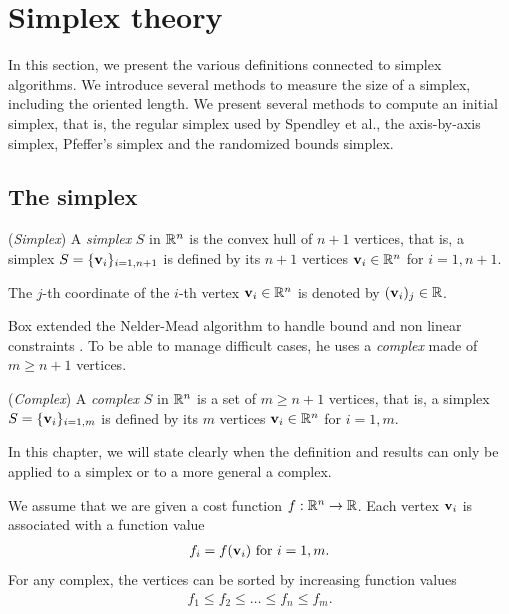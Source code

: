 \chapter{Simplex theory}

In this section, we present the various definitions connected
to simplex algorithms. We introduce several methods to measure 
the size of a simplex, including the oriented length. 
We present several methods to compute an
initial simplex, that is, the regular simplex used by Spendley et al.,
the axis-by-axis simplex, Pfeffer's simplex and the randomized 
bounds simplex.

\section{The simplex}

\begin{definition}
(\emph{Simplex})
A \emph{simplex} $S$ in $\mathbb{R}^n$ is the convex hull of $n+1$ vertices, that is, 
a simplex $S=\{\mathbf{v}_i\}_{i=1,n+1}$ is defined 
by its $n+1$ vertices $\mathbf{v}_i \in \mathbb{R}^n$ for $i=1,n+1$.
\end{definition}

The $j$-th coordinate of the $i$-th vertex $\mathbf{v}_i\in\mathbb{R}^n$ is denoted  
by $(\mathbf{v}_i)_j\in\mathbb{R}$.

Box extended the Nelder-Mead algorithm to handle bound and non linear constraints \cite{Box1965}.
To be able to manage difficult cases, he uses a \emph{complex} made of $m\geq n+1$ vertices.

\begin{definition}
(\emph{Complex})
A \emph{complex} $S$ in $\mathbb{R}^n$ is a set of $m\geq n+1$ vertices, that is, 
a simplex $S=\{\mathbf{v}_i\}_{i=1,m}$ is defined 
by its $m$ vertices $\mathbf{v}_i \in \mathbb{R}^n$ for $i=1,m$.
\end{definition}

In this chapter, we will state clearly when the definition and results can only be applied 
to a simplex or to a more general a complex. 

We assume that we are given a cost function $f:\mathbb{R}^n\rightarrow\mathbb{R}$.
Each vertex $\mathbf{v}_i$ is associated with a function value 
\begin{eqnarray}
f_i = f(\mathbf{v}_i) \textrm{ for } i=1,m.
\end{eqnarray}
For any complex, the vertices can be sorted by increasing function values 
\begin{eqnarray}
\label{simplex-sortedfv}
f_1 \leq f_2 \leq \ldots \leq f_n \leq f_m.
\end{eqnarray}

